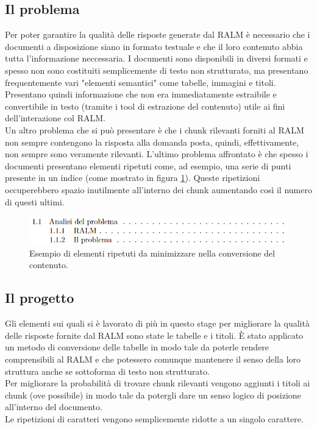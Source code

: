 \subsection{Il problema}
Per poter garantire la qualità delle risposte generate dal RALM è necessario che i documenti a disposizione siano in formato testuale e che il loro contenuto abbia tutta l'informazione 
neccessaria.
I documenti sono disponibili in diversi formati e spesso non sono costituiti semplicemente di testo non strutturato, ma presentano frequentemente vari
"elementi semantici" come tabelle, immagini e titoli.
Presentano quindi informazione che non era immediatamente estraibile e convertibile in testo (tramite i tool di estrazione del contenuto) utile ai fini dell'interazione col RALM. \\
Un altro problema che si può presentare è che i chunk rilevanti forniti al RALM non sempre contengono la risposta alla domanda posta, quindi, effettivamente, non sempre sono veramente rilevanti.
L'ultimo problema affrontato è che spesso i documenti presentano elementi ripetuti come, ad esempio, una serie di punti presente in un indice (come mostrato in figura \ref{fig:reps}).
Queste ripetizioni occuperebbero spazio inutilmente all'interno dei chunk aumentando così il numero di questi ultimi.

\begin{figure}[!h]
    \centering
    \includegraphics[width=0.8\columnwidth]{images/esempioIndice.png}
    \caption{Esempio di elementi ripetuti da minimizzare nella conversione del contenuto.}
    \label{fig:reps}
\end{figure}

\subsection{Il progetto}
Gli elementi sui quali si è lavorato di più in questo stage per migliorare la qualità delle risposte fornite dal RALM sono state le tabelle e i titoli.
È stato applicato un metodo di conversione delle tabelle in modo tale da poterle rendere comprensibili al RALM e che potessero comunque mantenere il senso della loro struttura anche se sottoforma di testo non strutturato. \\
Per migliorare la probabilità di trovare chunk rilevanti vengono aggiunti i titoli ai chunk (ove possibile) in modo tale da potergli dare un senso logico di posizione all'interno del documento. \\
Le ripetizioni di caratteri vengono semplicemente ridotte a un singolo carattere.

